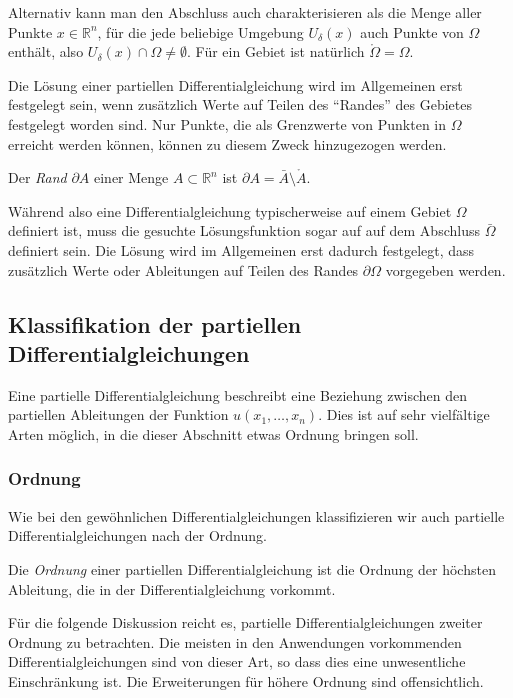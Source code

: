 Alternativ kann man den Abschluss auch charakterisieren als die Menge
aller Punkte $x\in\mathbb R^n$, für die jede beliebige Umgebung
$U_\delta(x)$ auch Punkte von $\Omega$ enthält, also
$U_\delta(x)\cap \Omega\ne \emptyset$.
Für ein Gebiet ist natürlich $\mathring\Omega=\Omega$.

Die Lösung einer partiellen Differentialgleichung wird im Allgemeinen erst
festgelegt sein, wenn zusätzlich Werte auf Teilen des ``Randes'' des
Gebietes festgelegt worden sind.
Nur Punkte, die als Grenzwerte von Punkten in $\Omega$ erreicht werden
können, können zu diesem Zweck hinzugezogen werden.

\begin{definition}
Der {\em Rand} $\partial A$ einer Menge $A\subset\mathbb R^n$ ist
$\partial A=\bar{A}\setminus\mathring{A}$.
\end{definition}

Während also eine Differentialgleichung typischerweise auf einem
Gebiet $\Omega$ definiert ist, muss die gesuchte Lösungsfunktion
sogar auf auf dem Abschluss $\bar{\Omega}$ definiert sein.
Die Lösung wird im Allgemeinen erst dadurch festgelegt, dass zusätzlich
Werte oder Ableitungen auf Teilen des Randes $\partial\Omega$ 
vorgegeben werden.

\subsection{Klassifikation der partiellen Differentialgleichungen
\label{subsection:pde:klassifikation}}
Eine partielle Differentialgleichung beschreibt eine Beziehung 
zwischen den partiellen Ableitungen der Funktion $u(x_1,\dots,x_n)$.
Dies ist auf sehr vielfältige Arten möglich, in die dieser Abschnitt
etwas Ordnung bringen soll.

\subsubsection{Ordnung}
Wie bei den gewöhnlichen Differentialgleichungen klassifizieren wir
auch partielle Differentialgleichungen nach der Ordnung.

\begin{definition}
Die {\em Ordnung} einer partiellen Differentialgleichung ist die
Ordnung der höchsten Ableitung, die in der Differentialgleichung
vorkommt.
\end{definition}

Für die folgende Diskussion reicht es, partielle Differentialgleichungen
zweiter Ordnung zu betrachten.
Die meisten in den Anwendungen vorkommenden Differentialgleichungen
sind von dieser Art, so dass dies eine unwesentliche Einschränkung ist.
Die Erweiterungen für höhere Ordnung sind offensichtlich.

